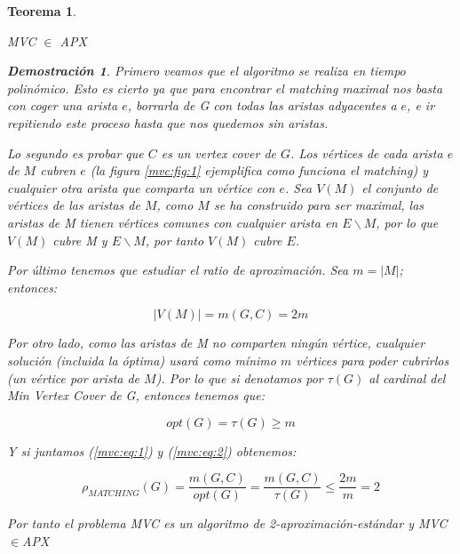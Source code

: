\documentclass[a4paper,12pt,titlepage]{article}
\newtheorem{teo}{Teorema}[section]
\newtheorem*{dem}{\textbf{Demostraci\'on}}
\begin{document}
\begin{teo}
\label{mvc:teo:1}

MVC $\in$ APX

\begin{dem}

Primero veamos que el algoritmo se realiza en tiempo polin\'omico.
Esto es cierto ya que para encontrar el matching maximal nos basta con coger una arista $e$, borrarla de G con todas las aristas adyacentes a $e$, e ir repitiendo este proceso hasta que nos quedemos sin aristas.

Lo segundo es probar que $C$ es un vertex cover de $G$. Los v\'ertices de cada arista $e$ de $M$ cubren $e$ (la figura \ref{mvc:fig:1} ejemplifica como funciona el matching) y cualquier otra arista que comparta un v\'ertice con $e$. Sea $V(M)$ el conjunto de v\'ertices de las aristas de $M$, como $M$ se ha construido para ser maximal, las aristas de M tienen v\'ertices comunes con cualquier arista en $E\backslash M$, por lo que $V(M)$ cubre M y $E\backslash M$, por tanto $V(M)$ cubre $E$.

Por \'ultimo tenemos que estudiar el ratio de aproximaci\'on.
Sea $m=|M|$; entonces:

\begin{equation} \label{mvc:eq:1}
|V(M)|=m(G,C)=2m
\end{equation}

Por otro lado, como las aristas de M no comparten ning\'un v\'ertice, cualquier soluci\'on (incluida la \'optima) usar\'a como m\'inimo $m$ v\'ertices para poder cubrirlos (un v\'ertice por arista de $M$). Por lo que si denotamos por $\tau(G)$ al cardinal del Min Vertex Cover de G, entonces tenemos que:

\begin{equation} \label{mvc:eq:2}
opt(G) = \tau(G) \geq m
\end{equation}

Y si juntamos (\ref{mvc:eq:1}) y (\ref{mvc:eq:2}) obtenemos:

\begin{equation} \label{mvc:eq:3}
\rho_{MATCHING}(G) = \frac{m(G,C)}{opt(G)} = \frac{m(G,C)}{\tau(G)} \leq \frac{2m}{m} = 2
\end{equation}

Por tanto el problema MVC es un algoritmo de 2-aproximaci\'on-est\'andar y MVC$\in$APX

\end{dem}

\end{teo}
\end{document}
